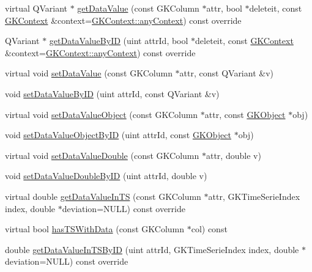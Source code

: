 \begin{DoxyCompactItemize}
\item 
virtual Q\+Variant $\ast$ \hyperlink{classGKObject_ac75262d879bc8dc912234fe64a618726}{get\+Data\+Value} (const G\+K\+Column $\ast$attr, bool $\ast$deleteit, const \hyperlink{classGKContext}{G\+K\+Context} \&context=\hyperlink{classGKContext_a37de2dc1b6bab087b9b92a445922e79d}{G\+K\+Context\+::any\+Context}) const override
\item 
Q\+Variant $\ast$ \hyperlink{classGKObject_a2d81f6712c496054d22b0437eba0f1cc}{get\+Data\+Value\+By\+ID} (uint attr\+Id, bool $\ast$deleteit, const \hyperlink{classGKContext}{G\+K\+Context} \&context=\hyperlink{classGKContext_a37de2dc1b6bab087b9b92a445922e79d}{G\+K\+Context\+::any\+Context}) const override
\item 
virtual void \hyperlink{classGKObject_afc228a2c74e04adfbe58190698ce60d6}{set\+Data\+Value} (const G\+K\+Column $\ast$attr, const Q\+Variant \&v)
\item 
void \hyperlink{classGKObject_a98906ea35fbf174d07c8e28b7f00438c}{set\+Data\+Value\+By\+ID} (uint attr\+Id, const Q\+Variant \&v)
\item 
virtual void \hyperlink{classGKObject_aa05a9ba7c67bfea85c4c834099261725}{set\+Data\+Value\+Object} (const G\+K\+Column $\ast$attr, const \hyperlink{classGKObject}{G\+K\+Object} $\ast$obj)
\item 
void \hyperlink{classGKObject_ab83cc937e9d3a0be93422b4f35315779}{set\+Data\+Value\+Object\+By\+ID} (uint attr\+Id, const \hyperlink{classGKObject}{G\+K\+Object} $\ast$obj)
\item 
virtual void \hyperlink{classGKObject_a7c3cb5302749d462ac8bebbaf6bd0368}{set\+Data\+Value\+Double} (const G\+K\+Column $\ast$attr, double v)
\item 
void \hyperlink{classGKObject_af2775908cda803e6d69fd37f8ad1e4a7}{set\+Data\+Value\+Double\+By\+ID} (uint attr\+Id, double v)
\item 
virtual double \hyperlink{classGKObject_ae7b4508b5a12cc7165adae7ab40d3836}{get\+Data\+Value\+In\+TS} (const G\+K\+Column $\ast$attr, G\+K\+Time\+Serie\+Index index, double $\ast$deviation=N\+U\+LL) const override
\item 
virtual bool \hyperlink{classGKObject_a04f3465ff3636cb557ad07814beccd47}{has\+T\+S\+With\+Data} (const G\+K\+Column $\ast$col) const 
\item 
double \hyperlink{classGKObject_ade795854307395ec3add6f01ff50c52a}{get\+Data\+Value\+In\+T\+S\+By\+ID} (uint attr\+Id, G\+K\+Time\+Serie\+Index index, double $\ast$deviation=N\+U\+LL) const override
\item 

\end{DoxyCompactItemize}
